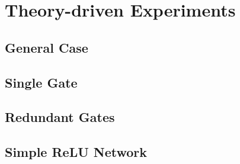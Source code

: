 \documentclass{article}
\begin{document}
\section{Theory-driven Experiments}

\subsection{General Case}

\subsection{Single Gate}

\subsection{Redundant Gates}






\newpage
\subsection{Simple ReLU Network}
\end{document}

